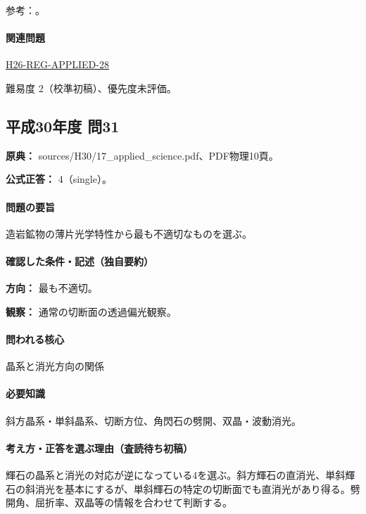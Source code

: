\par 参考：\cite{usgs_igneous_components,hom_forsterite}。

\paragraph{関連問題} \hyperref[q:h26-reg-applied-28]{H26-REG-APPLIED-28}

\par 難易度 2（校準初稿）、優先度未評価。

\subsection{平成30年度 問31}
\label{q:h30-reg-applied-31}

\noindent\textbf{原典：} sources/H30/17\_applied\_science.pdf、PDF物理10頁。

\textbf{公式正答：} 4（single）。

\paragraph{問題の要旨} 造岩鉱物の薄片光学特性から最も不適切なものを選ぶ。

\paragraph{確認した条件・記述（独自要約）}\mbox{}\par

\noindent\textbf{方向：} 最も不適切。\par

\noindent\textbf{観察：} 通常の切断面の透過偏光観察。\par

\paragraph{問われる核心} 晶系と消光方向の関係

\paragraph{必要知識} 斜方晶系・単斜晶系、切断方位、角閃石の劈開、双晶・波動消光。

\paragraph{考え方・正答を選ぶ理由（査読待ち初稿）} 輝石の晶系と消光の対応が逆になっている4を選ぶ。斜方輝石の直消光、単斜輝石の斜消光を基本にするが、単斜輝石の特定の切断面でも直消光があり得る。劈開角、屈折率、双晶等の情報を合わせて判断する。

